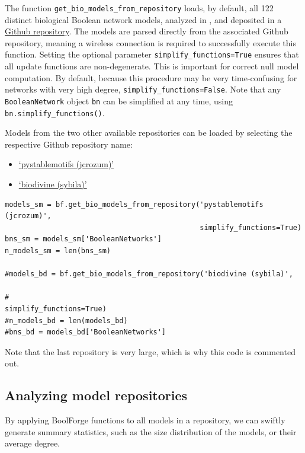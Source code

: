 \documentclass[
]{article}
\providecommand{\tightlist}{%
  \setlength{\itemsep}{0pt}\setlength{\parskip}{0pt}}
\begin{document}
The function \texttt{get\_bio\_models\_from\_repository} loads, by
default, all 122 distinct biological Boolean network models, analyzed in
\citet{kadelka2024meta}, and deposited in a
\href{https://github.com/ckadelka/DesignPrinciplesGeneNetworks}{Github
repository}. The models are parsed directly from the associated Github
repository, meaning a wireless connection is required to successfully
execute this function. Setting the optional parameter
\texttt{simplify\_functions=True} ensures that all update functions are
non-degenerate. This is important for correct null model computation. By
default, because this procedure may be very time-confusing for networks
with very high degree, \texttt{simplify\_functions=False}. Note that any
\texttt{BooleanNetwork} object \texttt{bn} can be simplified at any
time, using \texttt{bn.simplify\_functions()}.

Models from the two other available repositories can be loaded by
selecting the respective Github repository name:

\begin{itemize}
\tightlist
\item
  \href{https://github.com/jcrozum/pystablemotifs}{`pystablemotifs
  (jcrozum)'}
\item
  \href{https://github.com/sybila/biodivine-boolean-models}{`biodivine
  (sybila)'}
\end{itemize}

\begin{lstlisting}
models_sm = bf.get_bio_models_from_repository('pystablemotifs (jcrozum)',
                                              simplify_functions=True)
bns_sm = models_sm['BooleanNetworks']
n_models_sm = len(bns_sm)

#models_bd = bf.get_bio_models_from_repository('biodivine (sybila)',

#                                              simplify_functions=True)
#n_models_bd = len(models_bd)
#bns_bd = models_bd['BooleanNetworks']
\end{lstlisting}

Note that the last repository is very large, which is why this code is
commented out.

\subsection{Analyzing model
repositories}\label{analyzing-model-repositories}

By applying BoolForge functions to all models in a repository, we can
swiftly generate summary statistics, such as the size distribution of
the models, or their average degree.
\end{document}
